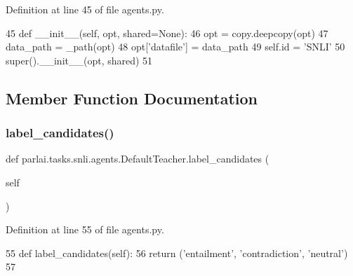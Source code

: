Definition at line 45 of file agents.\+py.


\begin{DoxyCode}
45     \textcolor{keyword}{def }\_\_init\_\_(self, opt, shared=None):
46         opt = copy.deepcopy(opt)
47         data\_path = \_path(opt)
48         opt[\textcolor{stringliteral}{'datafile'}] = data\_path
49         self.id = \textcolor{stringliteral}{'SNLI'}
50         super().\_\_init\_\_(opt, shared)
51 
\end{DoxyCode}


\subsection{Member Function Documentation}
\mbox{\label{classparlai_1_1tasks_1_1snli_1_1agents_1_1DefaultTeacher_a45fd82c9eb1ba3b08c8188e921edb273}} 
\subsubsection{\texorpdfstring{label\+\_\+candidates()}{label\_candidates()}}
{\footnotesize\ttfamily def parlai.\+tasks.\+snli.\+agents.\+Default\+Teacher.\+label\+\_\+candidates (\begin{DoxyParamCaption}\item[{}]{self }\end{DoxyParamCaption})}



Definition at line 55 of file agents.\+py.


\begin{DoxyCode}
55     \textcolor{keyword}{def }label\_candidates(self):
56         \textcolor{keywordflow}{return} (\textcolor{stringliteral}{'entailment'}, \textcolor{stringliteral}{'contradiction'}, \textcolor{stringliteral}{'neutral'})
57 \end{DoxyCode}
\mbox{\label{classparlai_1_1tasks_1_1snli_1_1agents_1_1DefaultTeacher_a1f2ea6fcc171a8ca8d2e739d5c929669}} 
